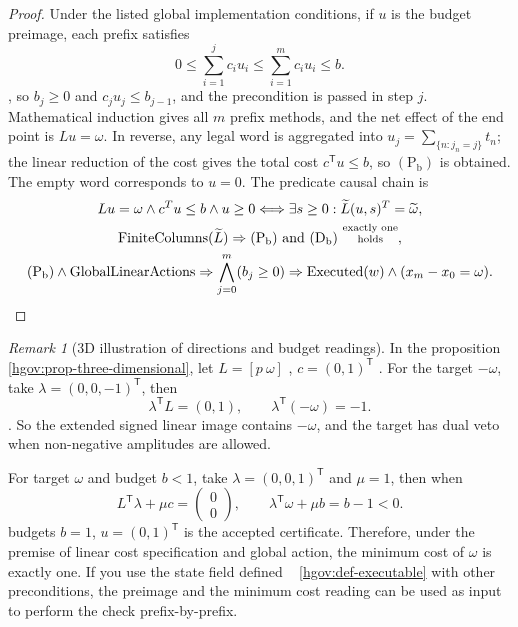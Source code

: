 \documentclass[12pt,a4paper,openany,notitlepage]{report}
\theoremstyle{plain}
\theoremstyle{definition}
\theoremstyle{remark}
\newtheorem{remark}[theorem]{Remark}
\begin{document}
\begin{CJK*}
\begin{proof}
Under the listed global implementation conditions, if $u$ is the budget preimage, each prefix satisfies \[
 0\le\sum_{i=1}^{j}c_i u_i
 \le\sum_{i=1}^{m}c_i u_i\le b.
\], so $b_j\ge0$ and $c_ju_j\le b_{j-1}$, and the precondition is passed in step $j$. Mathematical induction gives all $m$ prefix methods, and the net effect of the end point is $Lu=\omega$. In reverse, any legal word is aggregated into $u_j=\sum_{\{n:j_n=j\}}t_n$; the linear reduction of the cost gives the total cost $c^{\mathsf T}u\le b$, so $\mathrm{(P_b)}$ is obtained. The empty word corresponds to $u=0$. The predicate causal chain is \[
 \begin{gathered}
 Lu=\omega\land c^{\mathsf T}u\le b\land u\ge0
 \Longleftrightarrow
 \exists s\ge0:\widetilde L(u,s)^{\mathsf T}
                   =\widetilde\omega,\\
 \operatorname{FiniteColumns}(\widetilde L)
 \Rightarrow\mathrm{(P_b)}\ \text{and}\ \mathrm{(D_b)}
          \ \text{\shortstack[c]{\scriptsize exactly one\\[-1pt]\scriptsize holds}},\\
 \mathrm{(P_b)}\land\operatorname{GlobalLinearActions}
 \Rightarrow\bigwedge_{j=0}^{m}(b_j\ge0)
 \Rightarrow\operatorname{Executed}(w)\land(x_m-x_0=\omega).
 \end{gathered}
\]\end{proof}


\begin{remark}
[3D illustration of directions and budget readings]\label{exp:hom:budget-example}
In the proposition ~ \ref{hgov:prop-three-dimensional}, let $L=[p\ \omega]$ , $c=(0,1)^{\mathsf T}$ . For the target $-\omega$, take $\lambda=(0,0,-1)^{\mathsf T}$, then \[
 \lambda^{\mathsf T}L=(0,1),\qquad
 \lambda^{\mathsf T}(-\omega)=-1.
\]. So the extended signed linear image contains $-\omega$, and the target has dual veto when non-negative amplitudes are allowed.

For target $\omega$ and budget $b<1$, take $\lambda=(0,0,1)^{\mathsf T}$ and $\mu=1$, then when \[
 L^{\mathsf T}\lambda+\mu c=\begin{pmatrix}0\\0\end{pmatrix},
 \qquad
 \lambda^{\mathsf T}\omega+\mu b=b-1<0.
\] budgets $b=1$, $u=(0,1)^{\mathsf T}$ is the accepted certificate. Therefore, under the premise of linear cost specification and global action, the minimum cost of $\omega$ is exactly one. If you use the state field defined ~ \ref{hgov:def-executable} with other preconditions, the preimage and the minimum cost reading can be used as input to perform the check prefix-by-prefix.\end{remark}



\end{CJK*}
\end{document}

